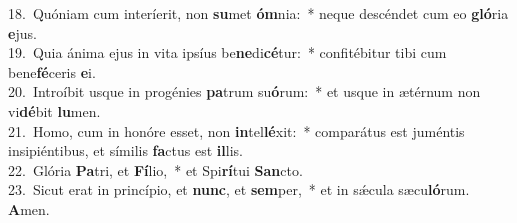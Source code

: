 {18.~}Quóniam cum interíerit, non \textbf{su}met \textbf{óm}nia:~* neque descéndet cum eo \textbf{gló}ria \textbf{e}jus.\\
{19.~}Quia ánima ejus in vita ipsíus be\textbf{ne}di\textbf{cé}tur:~* confitébitur tibi cum bene\textbf{fé}ceris \textbf{e}i.\\
{20.~}Introíbit usque in progénies \textbf{pa}trum su\textbf{ó}rum:~* et usque in ætérnum non vi\textbf{dé}bit \textbf{lu}men.\\
{21.~}Homo, cum in honóre esset, non \textbf{in}tel\textbf{lé}xit:~* comparátus est juméntis insipiéntibus, et símilis \textbf{fa}ctus est \textbf{il}lis.\\
{22.~}Glória \textbf{Pa}tri, et \textbf{Fí}lio,~* et Spi\textbf{rí}tui \textbf{San}cto.\\
{23.~}Sicut erat in princípio, et \textbf{nunc}, et \textbf{sem}per,~* et in sǽcula sæcu\textbf{ló}rum. \textbf{A}men.\\
